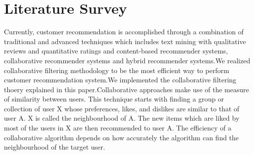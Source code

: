 \documentclass[11pt]{article} %
\begin{document}
\section{Literature Survey}
Currently, customer recommendation is accomplished through a combination of traditional and advanced techniques which includes text mining with qualitative reviews and quantitative ratings \cite{9}\cite{10} and content-based recommender systems, collaborative recommender systems and hybrid recommender systems\cite{11}.We realized collaborative filtering methodology to be the most efficient way to perform customer recommendation system.We implemented the collaborative filtering thoery explained in this paper.Collaborative approaches\cite{11} make use of the measure of similarity between users. This technique starts with finding a group or collection of user X whose preferences, likes, and dislikes are similar to that of user A. X is called the neighbourhood of A. The new items which are liked by most of the users in X are then recommended to user A. The efficiency of a collaborative algorithm depends on how accurately the algorithm can find the neighbourhood of the target user. 
\end{document}
